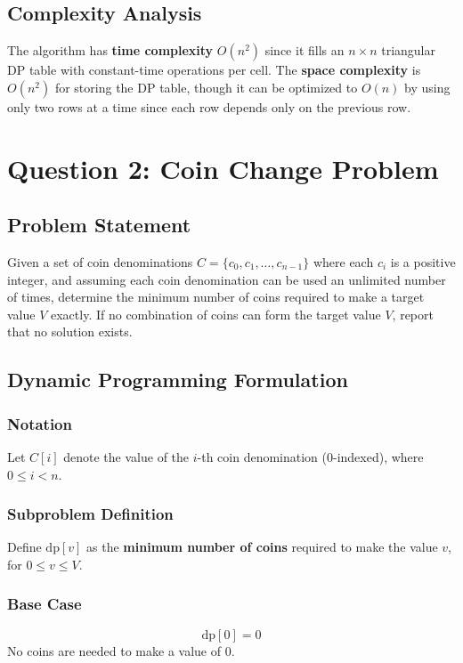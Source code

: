 \documentclass[12pt,a4paper]{article}
\begin{document}
\subsection*{Complexity Analysis}

The algorithm has \textbf{time complexity} $O(n^2)$ since it fills an $n \times n$ triangular DP table with constant-time operations per cell. The \textbf{space complexity} is $O(n^2)$ for storing the DP table, though it can be optimized to $O(n)$ by using only two rows at a time since each row depends only on the previous row.

\newpage

\section*{Question 2: Coin Change Problem}

\subsection*{Problem Statement}
Given a set of coin denominations $C = \{c_0, c_1, \ldots, c_{n-1}\}$ where each $c_i$ is a positive integer, and assuming each coin denomination can be used an unlimited number of times, determine the minimum number of coins required to make a target value $V$ exactly. If no combination of coins can form the target value $V$, report that no solution exists.

\subsection*{Dynamic Programming Formulation}

\subsubsection*{Notation}
Let $C[i]$ denote the value of the $i$-th coin denomination (0-indexed), where $0 \le i < n$.

\subsubsection*{Subproblem Definition}
Define $\text{dp}[v]$ as the \textbf{minimum number of coins} required to make the value $v$, for $0 \le v \le V$.

\subsubsection*{Base Case}
\[
    \text{dp}[0] = 0
\]
No coins are needed to make a value of 0.
\end{document}
